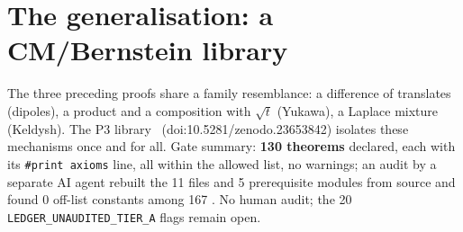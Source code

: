 \section{The generalisation: a CM/Bernstein library}\label{ch2:sec:lib}

The three preceding proofs share a family resemblance: a difference of translates (dipoles), a product and a
composition with $\sqrt t$ (Yukawa), a Laplace mixture (Keldysh). The P3 library~\cite{p3} (doi\string:10.5281/zenodo.23653842)
isolates these mechanisms once and for all. Gate summary: \textbf{130 theorems} declared, each with its
\texttt{\#print axioms} line, all within the allowed list, no warnings; an audit by a separate AI agent
rebuilt the 11 files and 5 prerequisite modules from source and found 0 off-list constants among 167
\tierA. No human audit; the 20 \texttt{LEDGER\_UNAUDITED\_TIER\_A} flags remain open.

